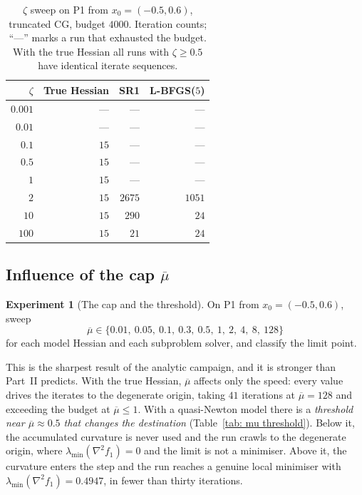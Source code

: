 \documentclass[11pt]{article}
\theoremstyle{plain}
\theoremstyle{definition}
\newtheorem{experiment}{Experiment}
\theoremstyle{remark}
\numberwithin{equation}{section}
\begin{document}
\begin{table}[htbp]
  \centering
  \caption{$\zeta$ sweep on P1 from $x_0 = (-0.5,0.6)$, truncated CG, budget $4000$.
           Iteration counts; ``---'' marks a run that exhausted the budget. With the true
           Hessian all runs with $\zeta \geq 0.5$ have identical iterate sequences.}
  \label{tab: zeta P1}
  \small
  \begin{tabular}{rrrr}
    \toprule
    $\zeta$ & True Hessian & SR1 & L-BFGS($5$) \\
    \midrule
    $0.001$ & ---   & ---   & ---   \\
    $0.01$  & ---   & ---   & ---   \\
    $0.1$   & $15$  & ---   & ---   \\
    $0.5$   & $15$  & ---   & ---   \\
    $1$     & $15$  & ---   & ---   \\
    $2$     & $15$  & $2675$ & $1051$ \\
    $10$    & $15$  & $290$  & $24$   \\
    $100$   & $15$  & $21$   & $24$   \\
    \bottomrule
  \end{tabular}
\end{table}

\subsection{Influence of the cap \texorpdfstring{$\overline{\mu}$}{mu-bar}}
\label{sec: exp mu}

\begin{experiment}[The cap and the threshold]
\label{exp: mu}
On P1 from $x_0 = (-0.5,0.6)$, sweep
\begin{equation*}
  \overline{\mu} \in \{0.01,\ 0.05,\ 0.1,\ 0.3,\ 0.5,\ 1,\ 2,\ 4,\ 8,\ 128\}
\end{equation*}
for each model Hessian and each subproblem solver, and classify the limit point.
\end{experiment}

This is the sharpest result of the analytic campaign, and it is stronger than Part~II predicts.
With the true Hessian, $\overline{\mu}$ affects only the speed: every value drives the iterates
to the degenerate origin, taking $41$ iterations at $\overline{\mu} = 128$ and exceeding the
budget at $\overline{\mu} \leq 1$. With a quasi-Newton model there is a
\emph{threshold near $\overline{\mu} \approx 0.5$ that changes the destination}
(Table~\ref{tab: mu threshold}). Below it, the accumulated curvature is never used and the run
crawls to the degenerate origin, where $\lambda_{\min}(\nabla^2 f_1) = 0$ and the limit is not a
minimiser. Above it, the curvature enters the step and the run reaches a genuine local minimiser
with $\lambda_{\min}(\nabla^2 f_1) = 0.4947$, in fewer than thirty iterations.
\end{document}
